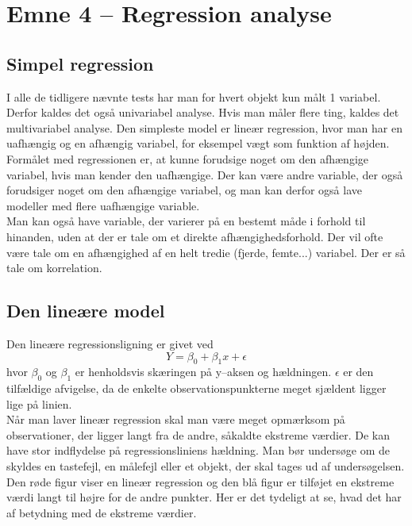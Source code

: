 \documentclass[11pt]{article}
\begin{document}

\newpage
\section{Emne 4 -- Regression analyse}
\subsection{Simpel regression}
I alle de tidligere nævnte tests har man for hvert objekt kun målt 1 variabel. Derfor kaldes det også univariabel analyse. Hvis man måler flere ting, kaldes det multivariabel analyse.
Den simpleste model er lineær regression, hvor man har en uafhængig og en afhængig variabel, for eksempel vægt som funktion af højden.\\[0.2cm]
Formålet med regressionen er, at kunne forudsige noget om den afhængige variabel, hvis man kender den uafhængige. Der kan være andre variable, der også forudsiger noget om den afhængige variabel, og man kan derfor også lave modeller med flere uafhængige variable.\\[0.2cm]
Man kan også have variable, der varierer på en bestemt måde i forhold til hinanden, uden at der er tale om et direkte afhængighedsforhold. Der vil ofte være tale om en afhængighed af en helt tredie (fjerde, femte...) variabel. Der er så tale om korrelation.
\subsection{Den lineære model}
Den lineære regressionsligning er givet ved
$$Y=\beta_0+\beta_1x+\epsilon$$
hvor $\beta_0$ og $\beta_1$ er henholdsvis skæringen på y--aksen og hældningen. $\epsilon$ er den tilfældige afvigelse, da de enkelte observationspunkterne meget sjældent ligger lige på linien.\\[0.2cm]
Når man laver lineær regression skal man være meget opmærksom på observationer, der	ligger langt fra de andre, såkaldte ekstreme værdier. De kan have stor indflydelse på regressionsliniens hældning. Man bør undersøge om de skyldes en tastefejl, en  målefejl eller et objekt, der skal tages ud af undersøgelsen. Den røde figur viser en lineær regression og den blå figur er tilføjet en ekstreme værdi langt til højre for de andre punkter. Her er det tydeligt at se, hvad det har af betydning med de ekstreme værdier. 
\end{document}
